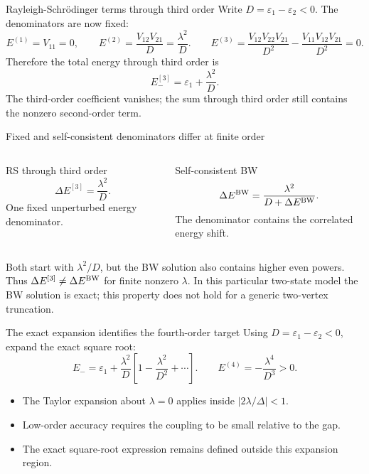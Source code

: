 \documentclass[aspectratio=169,10pt]{beamer}
\begin{document}
\begin{frame}{Rayleigh-Schr\"odinger terms through third order}
Write \(D=\varepsilon_1-\varepsilon_2<0\). The denominators are now fixed:
\[
E^{(1)}=V_{11}=0,\qquad
\boxed{E^{(2)}=\frac{V_{12}V_{21}}{D}=\frac{\lambda^2}{D}.}
\qquad
E^{(3)}=\frac{V_{12}V_{22}V_{21}}{D^2}
-\frac{V_{11}V_{12}V_{21}}{D^2}=0.
\]
Therefore the total energy through third order is
\[
\boxed{E_-^{[3]}=\varepsilon_1+\frac{\lambda^2}{D}.}
\]
\small The third-order coefficient vanishes; the sum through third order still contains the nonzero second-order term.
\end{frame}

\begin{frame}{Fixed and self-consistent denominators differ at finite order}
\begin{columns}[T,onlytextwidth]
\begin{block}{RS through third order}
\[
\Delta E^{[3]}=\frac{\lambda^2}{D}.
\]
One fixed unperturbed energy denominator.
\end{block}
\begin{exampleblock}{Self-consistent BW}
\[
\Delta E^{\rm BW}=\frac{\lambda^2}{D+\Delta E^{\rm BW}}.
\]
The denominator contains the correlated energy shift.
\end{exampleblock}
\end{columns}
\medskip
Both start with \(\lambda^2/D\), but the BW solution also contains higher even powers. Thus
\(\Delta E^{[3]}\ne\Delta E^{\rm BW}\) for finite nonzero \(\lambda\).
\small In this particular two-state model the BW solution is exact; this property does not hold for a generic two-vertex truncation.
\end{frame}

\begin{frame}{The exact expansion identifies the fourth-order target}
Using \(D=\varepsilon_1-\varepsilon_2<0\), expand the exact square root:
\[
\boxed{E_-=\varepsilon_1+\frac{\lambda^2}{D}
\left[1-\frac{\lambda^2}{D^2}+\cdots\right].}
\qquad
\boxed{E^{(4)}=-\frac{\lambda^4}{D^3}>0.}
\]
\begin{itemize}
\item The Taylor expansion about \(\lambda=0\) applies inside \(|2\lambda/\Delta|<1\).
\item Low-order accuracy requires the coupling to be small relative to the gap.
\item The exact square-root expression remains defined outside this expansion region.
\end{itemize}
\end{frame}
\end{document}
